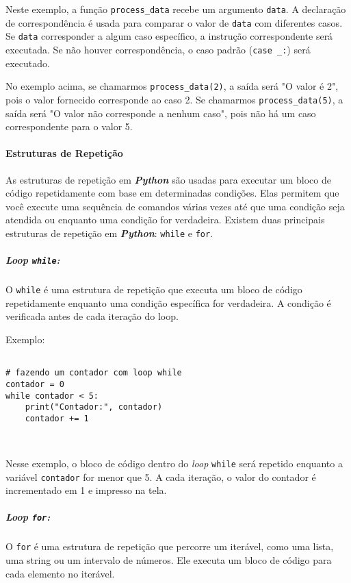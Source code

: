 \documentclass[a4paper, 12pt, onecolumn,singlespacing]{article}
\begin{document}
	Neste exemplo, a função \texttt{process\_data} recebe um argumento \texttt{data}. A declaração de correspondência é usada para comparar o valor de \texttt{data} com diferentes casos. Se \texttt{data} corresponder a algum caso específico, a instrução correspondente será executada. Se não houver correspondência, o caso padrão (\texttt{case \_:}) será executado.
	
	No exemplo acima, se chamarmos \texttt{process\_data(2)}, a saída será "O valor é 2", pois o valor fornecido corresponde ao caso 2. Se chamarmos \texttt{process\_data(5)}, a saída será "O valor não corresponde a nenhum caso", pois não há um caso correspondente para o valor 5.
	
	\paragraph{Estruturas de Repetição}
	\label{estruturas_de_repeticao}
	As estruturas de repetição em \textbf{\textit{Python}} são usadas para executar um bloco de código repetidamente com base em determinadas condições. Elas permitem que você execute uma sequência de comandos várias vezes até que uma condição seja atendida ou enquanto uma condição for verdadeira. Existem duas principais estruturas de repetição em \textbf{\textit{Python}}: \texttt{while} e \texttt{for}.
	
	\subparagraph{Loop \texttt{while}:}
	\label{python_loop_while}
	O \texttt{while} é uma estrutura de repetição que executa um bloco de código repetidamente enquanto uma condição específica for verdadeira. A condição é verificada antes de cada iteração do loop.
	
	Exemplo:
	
	\begin{verbatim}

# fazendo um contador com loop while	
contador = 0
while contador < 5:
	print("Contador:", contador)
	contador += 1

		
	\end{verbatim}
	\label{loop_while}

	Nesse exemplo, o bloco de código dentro do \textit{loop} \texttt{while} será repetido enquanto a variável \texttt{contador} for menor que 5. A cada iteração, o valor do contador é incrementado em 1 e impresso na tela.

	\subparagraph{Loop \texttt{for}: }
	\label{python_loop_for}
	O \texttt{for} é uma estrutura de repetição que percorre um iterável, como uma lista, uma string ou um intervalo de números. Ele executa um bloco de código para cada elemento no iterável.
	
\end{document}
